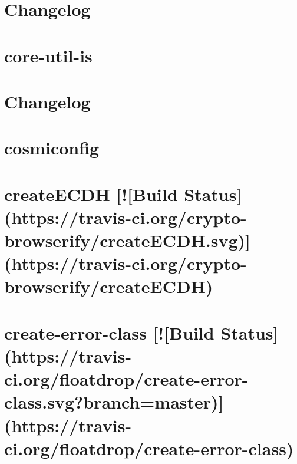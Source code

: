 \documentclass[twoside]{book}
\newcommand{\+}{\discretionary{\mbox{\scriptsize$\hookleftarrow$}}{}{}}
\begin{document}
\chapter{Changelog}
\label{md__c_1_workspace_demo_src_main_script_node_modules_core-js__c_h_a_n_g_e_l_o_g}

\chapter{core-\/util-\/is}
\label{md__c_1_workspace_demo_src_main_script_node_modules_core-util-is__r_e_a_d_m_e}

\chapter{Changelog}
\label{md__c_1_workspace_demo_src_main_script_node_modules_cosmiconfig__c_h_a_n_g_e_l_o_g}

\chapter{cosmiconfig}
\label{md__c_1_workspace_demo_src_main_script_node_modules_cosmiconfig__r_e_a_d_m_e}

\chapter{create\+E\+C\+DH \mbox{[}!\mbox{[}Build Status\mbox{]}(https\+://travis-\/ci.org/crypto-\/browserify/create\+E\+C\+DH.svg)\mbox{]}(https\+://travis-\/ci.org/crypto-\/browserify/create\+E\+C\+DH)}
\label{md__c_1_workspace_demo_src_main_script_node_modules_create-ecdh_readme}

\chapter{create-\/error-\/class \mbox{[}!\mbox{[}Build Status\mbox{]}(https\+://travis-\/ci.org/floatdrop/create-\/error-\/class.svg?branch=master)\mbox{]}(https\+://travis-\/ci.org/floatdrop/create-\/error-\/class)}
\label{md__c_1_workspace_demo_src_main_script_node_modules_create-error-class_readme}

\end{document}
